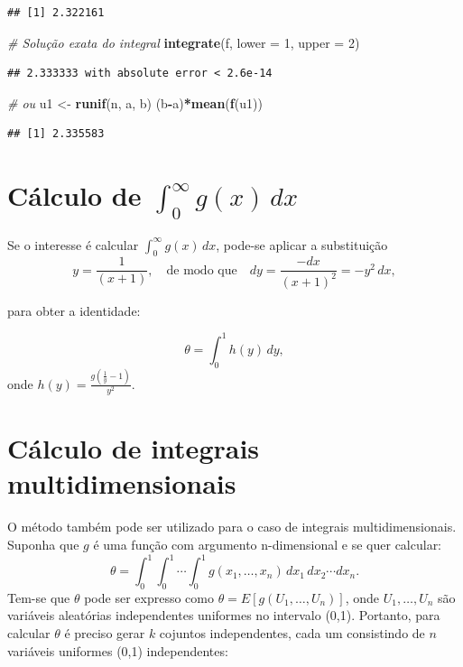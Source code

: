 \documentclass[
]{book}
\newenvironment{Shaded}{\begin{snugshade}}{\end{snugshade}}
\newcommand{\AttributeTok}[1]{\textcolor[rgb]{0.13,0.29,0.53}{#1}}
\newcommand{\CommentTok}[1]{\textcolor[rgb]{0.56,0.35,0.01}{\textit{#1}}}
\newcommand{\DecValTok}[1]{\textcolor[rgb]{0.00,0.00,0.81}{#1}}
\newcommand{\FunctionTok}[1]{\textcolor[rgb]{0.13,0.29,0.53}{\textbf{#1}}}
\newcommand{\NormalTok}[1]{#1}
\newcommand{\OtherTok}[1]{\textcolor[rgb]{0.56,0.35,0.01}{#1}}
\newcommand{\SpecialCharTok}[1]{\textcolor[rgb]{0.81,0.36,0.00}{\textbf{#1}}}
\begin{document}
\begin{verbatim}
## [1] 2.322161
\end{verbatim}

\begin{Shaded}
\begin{Highlighting}[]
\CommentTok{\# Solução exata do integral}
\FunctionTok{integrate}\NormalTok{(f, }\AttributeTok{lower =} \DecValTok{1}\NormalTok{, }\AttributeTok{upper =} \DecValTok{2}\NormalTok{)}
\end{Highlighting}
\end{Shaded}

\begin{verbatim}
## 2.333333 with absolute error < 2.6e-14
\end{verbatim}

\begin{Shaded}
\begin{Highlighting}[]
\CommentTok{\# ou}
\NormalTok{u1 }\OtherTok{\textless{}{-}} \FunctionTok{runif}\NormalTok{(n, a, b)}
\NormalTok{(b}\SpecialCharTok{{-}}\NormalTok{a)}\SpecialCharTok{*}\FunctionTok{mean}\NormalTok{(}\FunctionTok{f}\NormalTok{(u1))}
\end{Highlighting}
\end{Shaded}

\begin{verbatim}
## [1] 2.335583
\end{verbatim}

\section{\texorpdfstring{Cálculo de \(\int_{0}^{\infty}g(x)\, dx\)}{Cálculo de \textbackslash int\_\{0\}\^{}\{\textbackslash infty\}g(x)\textbackslash, dx}}\label{cuxe1lculo-de-int_0inftygx-dx}

Se o interesse é calcular \(\int_{0}^{\infty}g(x)\, dx\), pode-se aplicar
a substituição
\[y=\frac{1}{(x+1)}, \quad \text{de modo que} \quad dy=\frac{-dx}{(x+1)^2}=-y^2\,dx,\]

para obter a identidade:

\[\theta = \int_{0}^{1}h(y)\,dy,\] onde
\(h(y)=\frac{g(\frac{1}{y}-1)}{y^2}\).

\section{Cálculo de integrais multidimensionais}\label{cuxe1lculo-de-integrais-multidimensionais}

O método também pode ser utilizado para o caso de integrais
multidimensionais. Suponha que \(g\) é uma função com argumento
n-dimensional e se quer calcular:
\[\theta = \int_{0}^{1}\int_{0}^{1}\cdots \int_{0}^{1} g(x_1, \ldots,x_n)\, dx_1 \, dx_2\cdots dx_n.\]
Tem-se que \(\theta\) pode ser expresso como
\(\theta = E[g(U_1,\ldots,U_n)]\), onde \(U_1,\ldots,U_n\) são variáveis
aleatórias independentes uniformes no intervalo (0,1). Portanto, para
calcular \(\theta\) é preciso gerar \(k\) cojuntos independentes, cada um
consistindo de \(n\) variáveis uniformes (0,1) independentes:
\end{document}
